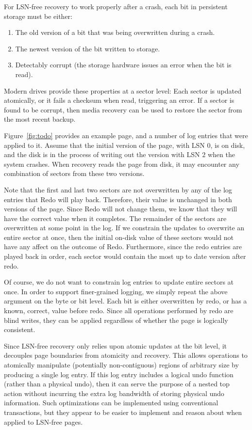 \documentclass[letterpaper,twocolumn,10pt]{article}
\begin{document}
For LSN-free recovery to work properly after a crash, each bit in
persistent storage must be either:

\begin{enumerate}
\item The old version of a bit that was being overwritten during a crash.
\item The newest version of the bit written to storage.
\item Detectably corrupt (the storage hardware issues an error when the
  bit is read).
\end{enumerate}

Modern drives provide these properties at a sector level: Each sector
is updated atomically, or it fails a checksum when read, triggering an
error.  If a sector is found to be corrupt, then media recovery can be
used to restore the sector from the most recent backup.

Figure~\ref{fig:todo} provides an example page, and a number of log
entries that were applied to it.  Assume that the initial version of
the page, with LSN $0$, is on disk, and the disk is in the process of
writing out the version with LSN $2$ when the system crashes.  When
recovery reads the page from disk, it may encounter any combination of
sectors from these two versions.

Note that the first and last two sectors are not overwritten by any
of the log entries that Redo will play back.  Therefore, their value
is unchanged in both versions of the page.  Since Redo will not change
them, we know that they will have the correct value when it completes.
The remainder of the sectors are overwritten at some point in the log.
If we constrain the updates to overwrite an entire sector at once, then
the initial on-disk value of these sectors would not have any affect
on the outcome of Redo.  Furthermore, since the redo entries are
played back in order, each sector would contain the most up to date
version after redo.

Of course, we do not want to constrain log entries to update entire
sectors at once.  In order to support finer-grained logging, we simply
repeat the above argument on the byte or bit level.  Each bit is
either overwritten by redo, or has a known, correct, value before
redo.  Since all operations performed by redo are blind writes, they
can be applied regardless of whether the page is logically consistent.

Since LSN-free recovery only relies upon atomic updates at the bit
level, it decouples page boundaries from atomicity and recovery.  
This allows operations to atomically manipulate
(potentially non-contiguous) regions of arbitrary size by producing a
single log entry.  If this log entry includes a logical undo function
(rather than a physical undo), then it can serve the purpose of a
nested top action without incurring the extra log bandwidth of storing
physical undo information.  Such optimizations can be implemented
using conventional transactions, but they appear to be easier to
implement and reason about when applied to LSN-free pages.
\end{document}
